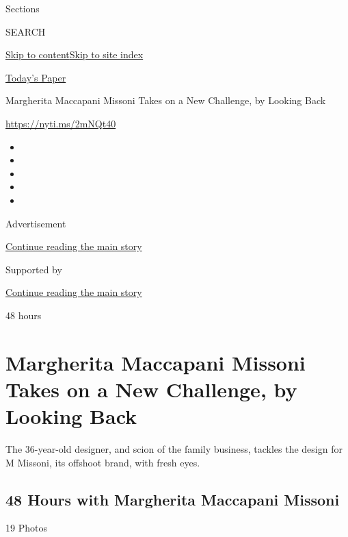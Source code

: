 Sections

SEARCH

\protect\hyperlink{site-content}{Skip to
content}\protect\hyperlink{site-index}{Skip to site index}

\href{https://myaccount.nytimes.com/auth/login?response_type=cookie\&client_id=vi}{}

\href{https://www.nytimes.com/section/todayspaper}{Today's Paper}

Margherita Maccapani Missoni Takes on a New Challenge, by Looking Back

\href{https://nyti.ms/2mNQt40}{https://nyti.ms/2mNQt40}

\begin{itemize}
\item
\item
\item
\item
\item
\end{itemize}

Advertisement

\protect\hyperlink{after-top}{Continue reading the main story}

Supported by

\protect\hyperlink{after-sponsor}{Continue reading the main story}

48 hours

\hypertarget{margherita-maccapani-missoni-takes-on-a-new-challenge-by-looking-back}{%
\section{Margherita Maccapani Missoni Takes on a New Challenge, by
Looking
Back}\label{margherita-maccapani-missoni-takes-on-a-new-challenge-by-looking-back}}

The 36-year-old designer, and scion of the family business, tackles the
design for M Missoni, its offshoot brand, with fresh eyes.

\href{https://www.nytimes.com/slideshow/2019/09/25/t-magazine/fashion/48-hours-with-margherita-maccapani-missoni.html}{}

\hypertarget{48-hours-with-margherita-maccapani-missoni}{%
\subsection{48 Hours with Margherita Maccapani
Missoni}\label{48-hours-with-margherita-maccapani-missoni}}

19 Photos


